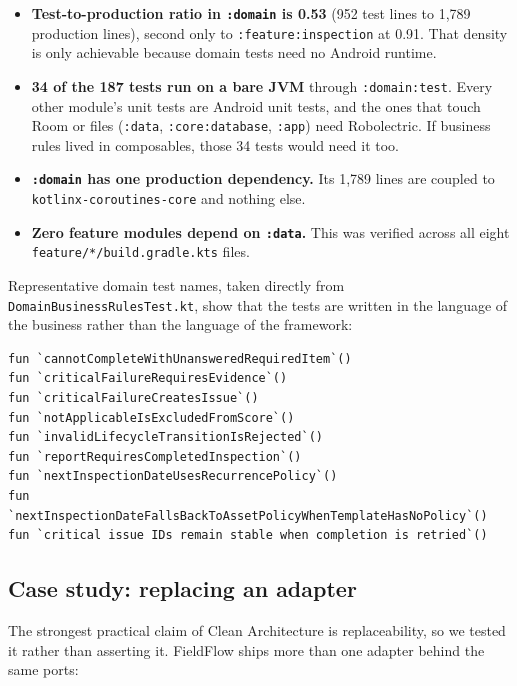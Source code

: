 \documentclass[11pt,a4paper]{article}
\newcommand{\mdl}[1]{\texttt{#1}}
\newcommand{\file}[1]{{\small\texttt{#1}}}
\begin{document}
\begin{itemize}[leftmargin=*]
  \item \textbf{Test-to-production ratio in \mdl{:domain} is 0.53} (952 test
        lines to 1{,}789 production lines), second only to
        \mdl{:feature:inspection} at 0.91. That density is only achievable
        because domain tests need no Android runtime.
  \item \textbf{34 of the 187 tests run on a bare JVM} through
        \texttt{:domain:test}. Every other module's unit tests are Android
        unit tests, and the ones that touch Room or files
        (\mdl{:data}, \mdl{:core:database}, \mdl{:app}) need Robolectric. If
        business rules lived in composables, those 34 tests would need it too.
  \item \textbf{\mdl{:domain} has one production dependency.} Its 1{,}789 lines
        are coupled to \texttt{kotlinx-coroutines-core} and nothing else.
  \item \textbf{Zero feature modules depend on \mdl{:data}.} This was verified
        across all eight \file{feature/*/build.gradle.kts} files.
\end{itemize}

Representative domain test names, taken directly from
\file{DomainBusinessRulesTest.kt}, show that the tests are written in the
language of the business rather than the language of the framework:

\begin{lstlisting}[caption={\file{domain/src/test/.../DomainBusinessRulesTest.kt}
--- test names as executable specification.}]
fun `cannotCompleteWithUnansweredRequiredItem`()
fun `criticalFailureRequiresEvidence`()
fun `criticalFailureCreatesIssue`()
fun `notApplicableIsExcludedFromScore`()
fun `invalidLifecycleTransitionIsRejected`()
fun `reportRequiresCompletedInspection`()
fun `nextInspectionDateUsesRecurrencePolicy`()
fun `nextInspectionDateFallsBackToAssetPolicyWhenTemplateHasNoPolicy`()
fun `critical issue IDs remain stable when completion is retried`()
\end{lstlisting}

\subsection{Case study: replacing an adapter}

The strongest practical claim of Clean Architecture is replaceability, so we
tested it rather than asserting it. FieldFlow ships more than one adapter behind
the same ports:
\end{document}
